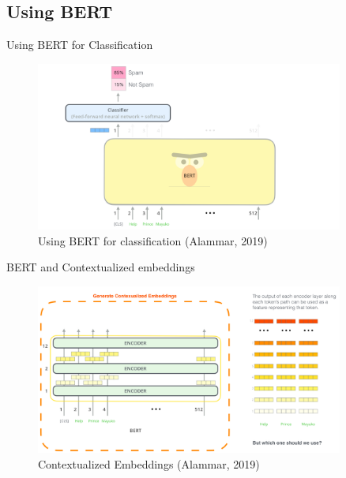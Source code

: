 \documentclass[10pt]{beamer}
\begin{document}
\subsection{Using BERT}

\begin{frame}{Using BERT for Classification}

\begin{figure}[h]
\centering
\includegraphics[width=0.9\textwidth]{fig/bert-classifier.png}
\caption{Using BERT for classification (Alammar, 2019)}
\end{figure}

\end{frame}

\begin{frame}{BERT and Contextualized embeddings}

\begin{figure}[h]
\centering
\includegraphics[width=0.9\textwidth]{fig/bert-contexualized-embeddings.png}
\caption{Contextualized Embeddings (Alammar, 2019)}
\end{figure}

\end{frame}
\end{document}
